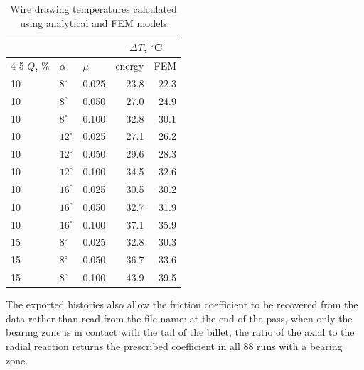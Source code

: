 \documentclass[subscriptcorrection,upint,varvw,barcolor=Goldenrod3,mathalfa=cal=euler,balance,hyphenate,french,pdf-a]{asmejour} %
\begin{document}
\begin{table}[htbp]
\centering\small
\caption{Wire drawing temperatures calculated using analytical and FEM models}
\label{tab:deltaT}
\begin{tabular}{@{}lllrr@{}}
\toprule
 & & & \multicolumn{2}{c}{$\Delta T$, $^\circ$C} \\
\cmidrule(l){4-5}
$Q$, \% & $\alpha$ & $\mu$ & energy & FEM \\
\midrule
10 & $8^\circ$  & 0.025 & 23.8 & 22.3 \\
10 & $8^\circ$  & 0.050 & 27.0 & 24.9 \\
10 & $8^\circ$  & 0.100 & 32.8 & 30.1 \\
10 & $12^\circ$ & 0.025 & 27.1 & 26.2 \\
10 & $12^\circ$ & 0.050 & 29.6 & 28.3 \\
10 & $12^\circ$ & 0.100 & 34.5 & 32.6 \\
10 & $16^\circ$ & 0.025 & 30.5 & 30.2 \\
10 & $16^\circ$ & 0.050 & 32.7 & 31.9 \\
10 & $16^\circ$ & 0.100 & 37.1 & 35.9 \\
15 & $8^\circ$  & 0.025 & 32.8 & 30.3 \\
15 & $8^\circ$  & 0.050 & 36.7 & 33.6 \\
15 & $8^\circ$  & 0.100 & 43.9 & 39.5 \\
\bottomrule
\end{tabular}
\end{table}

The exported histories also allow the friction coefficient to be recovered from the data rather
than read from the file name: at the end of the pass, when only the bearing zone is in contact with the
tail of the billet, the ratio of the axial to the radial reaction returns the prescribed
coefficient in all 88 runs with a bearing zone.
\end{document}
